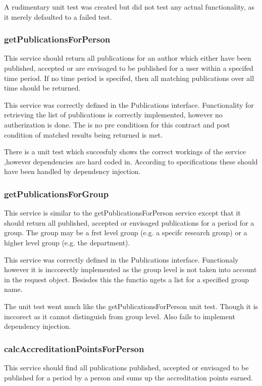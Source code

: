 \documentclass[a4paper,10pt]{article}
\begin{document}
A rudimentary unit test was created but did not test any actual functionality, as it merely defaulted to a failed test.

\subsubsection{getPublicationsForPerson}
This service should  return all publications for an author which either have been published, accepted or are
envisaged to be published for a user within a specifed time period. If no time period is specifed,
then all matching publications over all time should be returned.

This service was correctly defined in the Publications interface. Functionality for retrieving the list of publications is correctly implemented, however no autherization is done. The is no pre conditiosn for this contract and post condition of matched results being returned is met.

There is a unit test which succesfuly shows the correct workings of the service ,however dependencies are hard coded in. According to specifications these should have been handled by dependency injection.

\subsubsection{getPublicationsForGroup}
This service is similar to the getPublicationsForPerson service except that it  should return all published,
accepted or envisaged publications for a period for a group. The group may be a frst level group
(e.g. a specifc research group) or a higher level group (e.g. the department).

This service was correctly defined in the Publications interface. Functionaly however it is inccorectly implemented as the group level is not taken into account in the request object. Besisdes this the functio ngets a list for a specified group name.

The unit test went much like the getPublicationsForPerson unit test. Though it is inccorect as it cannot distinguish from group level. Also fails to implement dependency injection.


\subsubsection{calcAccreditationPointsForPerson}
This service should find all publications published, accepted or envisaged to be published for a period by
a person and sums up the accreditation points earned.
\end{document}
